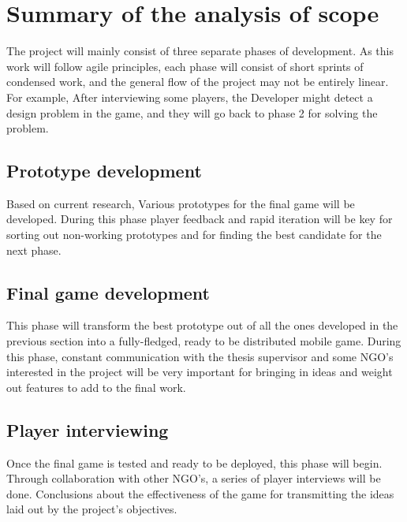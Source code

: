 \chapter{Summary of the analysis of scope}

The project will mainly consist of three separate phases of development. As this work will follow agile principles, each phase will consist of short sprints of condensed work, and the general flow of the project may not be entirely linear. For example, After interviewing some players, the Developer might detect a design problem in the game, and they will go back to phase 2 for solving the problem.

\section{Prototype development}

Based on current research, Various prototypes for the final game will be developed. During this phase player feedback and rapid iteration will be key for sorting out non-working prototypes and for finding the best candidate for the next phase. 

\section{Final game development}

This phase will transform the best prototype out of all the ones developed in the previous section into a fully-fledged, ready to be distributed mobile game. During this phase, constant communication with the thesis supervisor and some NGO's interested in the project will be very important for bringing in ideas and weight out features to add to the final work. 

\section{Player interviewing}

Once the final game is tested and ready to be deployed, this phase will begin. Through collaboration with other NGO's, a series of player interviews will be done. Conclusions about the effectiveness of the game for transmitting the ideas laid out by the project's objectives.

